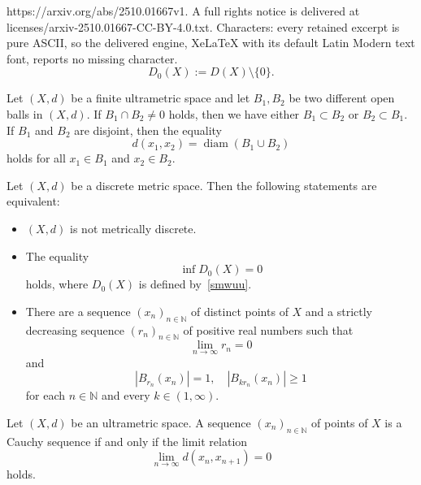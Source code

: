 \documentclass[10pt,a4paper]{amsart}
\begin{document}
https://arxiv.org/abs/2510.01667v1. A full rights notice is delivered at licenses/arxiv-2510.01667-CC-BY-4.0.txt. Characters: every retained excerpt is pure ASCII, so the delivered engine, XeLaTeX with its default Latin Modern text font, reports no missing character.
\begin{equation}
    \label{smwuu}
D_0(X):=D(X)\setminus \{0\}.
\end{equation}

\begin{lemma}\label{dcfghm}
Let $(X,d)$ be a finite ultrametric space and let $B_1, B_2$ be two different open balls in $(X,d)$. If $B_1 \cap B_2 \neq 0$ holds, then we have either $B_1 \subset B_2$ or $B_2 \subset B_1$. If $B_1$ and $B_2$ are disjoint, then the equality
\[
d(x_1, x_2) = \operatorname{diam}(B_1 \cup B_2)
\]
holds for all $x_1 \in B_1$ and $x_2 \in B_2$.
\end{lemma}

\begin{proposition}\label{qsswd}
Let $(X,d)$ be a discrete metric space.  
Then the following statements are equivalent:
\begin{itemize}[left=10pt]
    \item[(i)] $(X,d)$ is not metrically discrete.
    \item[(ii)] The equality
    \begin{equation}
        \label{llkk}
        \inf D_0(X) =0
        \end{equation}
    holds, where $D_0(X)$ is defined by~\eqref{smwuu}.
    \item[(iii)] There are a sequence $(x_n)_{n\in\mathbb{N}}$ of distinct points of $X$ 
    and a strictly decreasing sequence $(r_n)_{n\in\mathbb{N}}$ of  positive real numbers 
    such that 
    $$
    \lim\limits_{n\to\infty}r_n=0
    $$
    and
$$
\left|B_{r_n}(x_n)\right|=1,\quad \left|B_{kr_n}(x_n)\right|\geq 1
$$
    for each $n\in {\mathbb N}$ and every $k\in (1,\infty).$
\end{itemize}
\end{proposition}

\begin{proposition}\label{prop:ultrametric-cauchy}
Let $(X,d)$ be an ultrametric space. A sequence $(x_n)_{n\in\mathbb{N}}$ of points of $X$ 
is a Cauchy sequence if and only if the limit relation
\begin{equation*}
\lim_{n\to\infty} d(x_n, x_{n+1}) = 0
\end{equation*}
holds.
\end{proposition}
\end{document}
